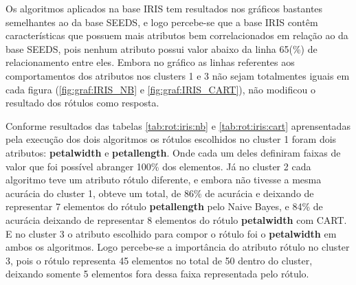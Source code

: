 Os algoritmos aplicados na base IRIS tem resultados nos gráficos bastantes semelhantes ao da base SEEDS, e logo percebe-se que a base IRIS contêm características que possuem mais atributos bem correlacionados em relação ao da base SEEDS, pois nenhum atributo possui valor abaixo da linha 65(\%) de relacionamento entre eles. Embora no gráfico as  linhas referentes aos comportamentos dos atributos  nos clusters 1 e 3 não sejam totalmentes iguais em cada figura (\ref{fig:graf:IRIS_NB} e \ref{fig:graf:IRIS_CART}), não  modificou o resultado dos rótulos como resposta.

Conforme resultados das tabelas \ref{tab:rot:iris:nb} e \ref{tab:rot:iris:cart} aprensentadas pela execução dos dois algoritmos os rótulos escolhidos no cluster 1 foram dois atributos: \textbf{petalwidth} e  \textbf{petallength}. Onde cada um deles definiram faixas de valor que foi possível abranger 100\% dos elementos. Já no cluster 2 cada algoritmo teve um atributo rótulo diferente, e embora não tivesse a mesma acurácia do cluster 1, obteve um total, de 86\% de acurácia e deixando de representar 7 elementos do rótulo \textbf{petallength} pelo Naive Bayes, e 84\% de acurácia deixando de representar 8 elementos do rótulo \textbf{petalwidth} com CART. E no cluster 3 o atributo escolhido para compor o rótulo foi o \textbf{petalwidth} em ambos os algoritmos. Logo percebe-se a importância do atributo rótulo no cluster 3,  pois o rótulo representa 45 elementos no total de 50 dentro do cluster, deixando somente 5 elementos fora dessa faixa representada pelo rótulo.



